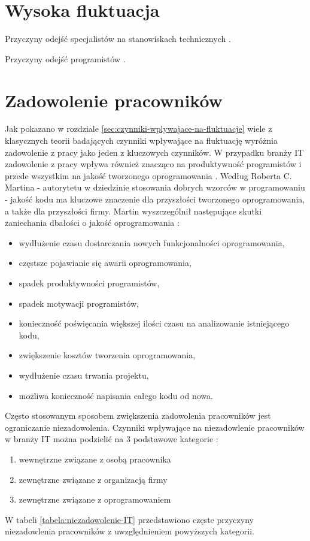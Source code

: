 \section{Wysoka fluktuacja}\label{sec:it-turnover}

Przyczyny odejść specjalistów na stanowiskach technicznych \cite{kapor-2017}.

Przyczyny odejść programistów \cite{hannon-2008}.


\section{Zadowolenie pracowników}\label{sec:it-motivation}
Jak pokazano w rozdziale \ref{sec:czynniki-wplywajace-na-fluktuacje} wiele z klasycznych teorii badających czynniki wpływające na fluktuację wyróżnia zadowolenie z pracy jako jeden z kluczowych czynników.
W przypadku branży IT zadowolenie z pracy wpływa również znacząco na produktywność programistów i przede wszystkim na jakość tworzonego oprogramowania \cite{graziotin-2018}.
Według Roberta C. Martina - autorytetu w dziedzinie stosowania dobrych wzorców w programowaniu - jakość kodu ma kluczowe znaczenie dla przyszłości tworzonego oprogramowania, a także dla przyszłości firmy.
Martin wyszczególnił następujące skutki zaniechania dbałości o jakość oprogramowania \cite{martin-2014}:
\begin{itemize}
    \item wydłużenie czasu dostarczania nowych funkcjonalności oprogramowania,
    \item częstsze pojawianie się awarii oprogramowania,
    \item spadek produktywności programistów,
    \item spadek motywacji programistów,
    \item konieczność poświęcania większej ilości czasu na analizowanie istniejącego kodu,
    \item zwiększenie kosztów tworzenia oprogramowania,
    \item wydłużenie czasu trwania projektu,
    \item możliwa konieczność napisania całego kodu od nowa.
\end{itemize}

Często stosowanym sposobem zwiększenia zadowolenia pracowników jest ograniczanie niezadowolenia.
Czynniki wpływające na niezadowlenie pracowników w branży IT można podzielić na 3 podstawowe kategorie \cite{graziotin-2017}:
\begin{enumerate}
    \item wewnętrzne związane z osobą pracownika
    \item zewnętrzne związane z organizacją firmy
    \item zewnętrzne związane z oprogramowaniem
    \end{enumerate}
W tabeli \ref{tabela:niezadowolenie-IT} przedstawiono częste przyczyny niezadowlenia pracowników z uwzględnieniem powyższych kategorii.

